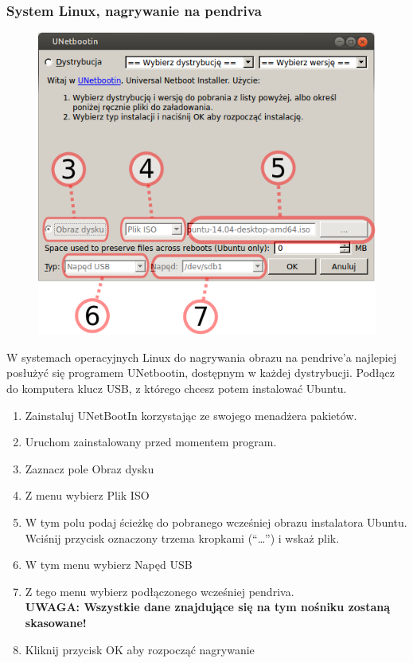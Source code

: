 \subsubsection{System Linux, nagrywanie na pendriva}
\begin{figure}
                \includegraphics[width=\linewidth]{images/instalacja_nagrywanie_obrazu_linux.png}
\end{figure}

W systemach operacyjnych Linux do nagrywania obrazu na pendrive'a najlepiej posłużyć się programem \textcolor{ubuntu_orange}{UNetbootin}, dostępnym w każdej dystrybucji. Podłącz do komputera klucz USB, z którego chcesz potem instalować Ubuntu.
\begin{enumerate}[label=\protect\circled{\arabic*}]
\item Zainstaluj UNetBootIn korzystając ze swojego menadżera pakietów.
\item Uruchom zainstalowany przed momentem program.
\item Zaznacz pole Obraz dysku
\item Z menu wybierz Plik ISO
\item W tym polu podaj ścieżkę do pobranego wcześniej obrazu instalatora Ubuntu. Wciśnij przycisk oznaczony trzema kropkami (“\ldots”) i wskaż plik.
\item W tym menu wybierz Napęd USB
\item Z tego menu wybierz podłączonego wcześniej pendriva.\\
\textbf{UWAGA: Wszystkie dane znajdujące się na tym nośniku zostaną skasowane!}
\item Kliknij przycisk OK aby rozpocząć nagrywanie
\end{enumerate}
